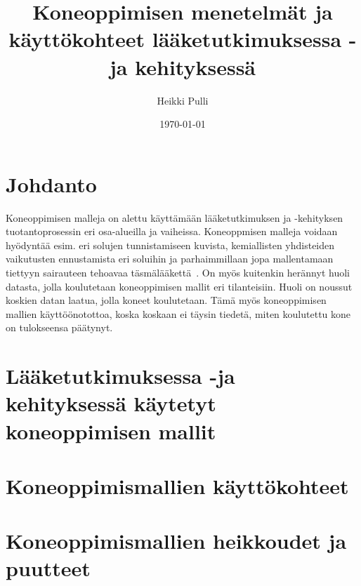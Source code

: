 \documentclass[finnish,twoside,censored,essay,sw-line]{HYthesisML}
\title{Koneoppimisen menetelmät ja käyttökohteet lääketutkimuksessa -ja kehityksessä}
\author{Heikki Pulli}
\date{\today}
\begin{document}
\maketitle

\mytableofcontents
\mainmatter

\chapter{Johdanto}





Koneoppimisen malleja on alettu käyttämään lääketutkimuksen ja -kehityksen tuotantoprosessin eri osa-alueilla ja vaiheissa. Koneoppmisen malleja voidaan hyödyntää esim. eri
solujen tunnistamiseen kuvista, kemiallisten yhdisteiden vaikutusten ennustamista eri soluihin ja parhaimmillaan jopa mallentamaan tiettyyn sairauteen tehoavaa täsmälääkettä~\cite{VamathevanJessica2019Aoml}.
On myös kuitenkin herännyt huoli datasta, jolla koulutetaan koneoppimisen mallit eri tilanteisiin. Huoli on noussut koskien datan laatua, jolla koneet koulutetaan. Tämä myös
koneoppimisen mallien käyttöönotottoa, koska koskaan ei täysin tiedetä, miten koulutettu kone on tulokseensa päätynyt.

\chapter{Lääketutkimuksessa -ja kehityksessä käytetyt koneoppimisen mallit}

\chapter{Koneoppimismallien käyttökohteet}

\chapter{Koneoppimismallien heikkoudet ja puutteet}

\cleardoublepage
{}
{}
\printbibliography

\backmatter
\end{document}
